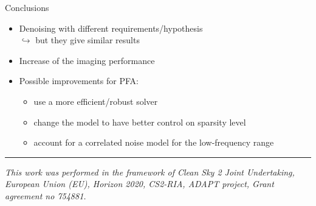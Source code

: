 \documentclass[10pt,xcolor=x11names,compress, show notes]{beamer}%
\begin{document}
\begin{frame}{Conclusions}
	\vspace{2.5em}
\begin{itemize}
	\item Denoising with different requirements/hypothesis\\
	$\hookrightarrow$ but they give similar results\\
	\vspace{2.5em}
        \item Increase of the imaging performance
	\vspace{2.5em}
	\item Possible improvements for PFA:
	\begin{itemize}
        		\item use a more efficient/robust solver
        		\item change the model to have better control on sparsity level%
        		\item account for a correlated noise model for the low-frequency range%
	\end{itemize}
\end{itemize}

\vspace{1cm}

\begin{center}
	\noindent\rule{\textwidth}{0.4pt}
	\textcolor{black!70}{\scriptsize \itshape{ 
	\centering This work was performed in the framework of Clean Sky 2 Joint Undertaking, European Union (EU), Horizon 2020, CS2-RIA, ADAPT project, Grant agreement no 754881.}}
\end{center}
\end{frame}
\end{document}

